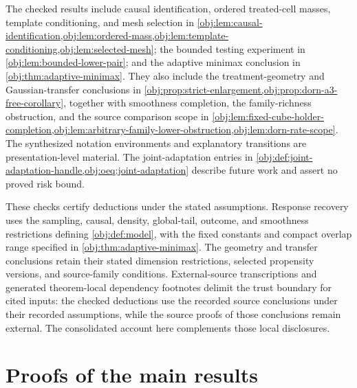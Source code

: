 \documentclass[11pt]{article}
\begin{document}
The checked results include causal identification, ordered treated-cell masses, template conditioning, and mesh selection in \cref{obj:lem:causal-identification,obj:lem:ordered-mass,obj:lem:template-conditioning,obj:lem:selected-mesh}; the bounded testing experiment in \cref{obj:lem:bounded-lower-pair}; and the adaptive minimax conclusion in \cref{obj:thm:adaptive-minimax}. They also include the treatment-geometry and Gaussian-transfer conclusions in \cref{obj:prop:strict-enlargement,obj:prop:dorn-a3-free-corollary}, together with smoothness completion, the family-richness obstruction, and the source comparison scope in \cref{obj:lem:fixed-cube-holder-completion,obj:lem:arbitrary-family-lower-obstruction,obj:lem:dorn-rate-scope}. The synthesized notation environments and explanatory transitions are presentation-level material. The joint-adaptation entries in \cref{obj:def:joint-adaptation-handle,obj:oeq:joint-adaptation} describe future work and assert no proved risk bound.

These checks certify deductions under the stated assumptions. Response recovery uses the sampling, causal, density, global-tail, outcome, and smoothness restrictions defining \cref{obj:def:model}, with the fixed constants and compact overlap range specified in \cref{obj:thm:adaptive-minimax}. The geometry and transfer conclusions retain their stated dimension restrictions, selected propensity versions, and source-family conditions. External-source transcriptions and generated theorem-local dependency footnotes delimit the trust boundary for cited inputs: the checked deductions use the recorded source conclusions under their recorded assumptions, while the source proofs of those conclusions remain external. The consolidated account here complements those local disclosures.


\section{Proofs of the main results}\label{sec:deferred-proofs}
\end{document}

